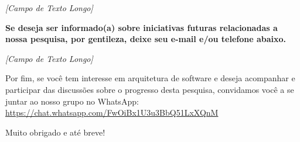 \noindent
\textit{[Campo de Texto Longo]}

\noindent
\textbf{Se deseja ser informado(a) sobre iniciativas futuras relacionadas a nossa
pesquisa, por gentileza, deixe seu e-mail e/ou telefone abaixo.}

\noindent
\textit{[Campo de Texto Longo]}

\noindent
Por fim, se você tem interesse em arquitetura de software e deseja acompanhar e participar 
das discussões sobre o progresso desta pesquisa, convidamos você a se juntar ao nosso 
grupo no WhatsApp: \url{https://chat.whatsapp.com/FwOiBx1U3u3BbQ51LxXQnM}

\noindent
Muito obrigado e até breve!